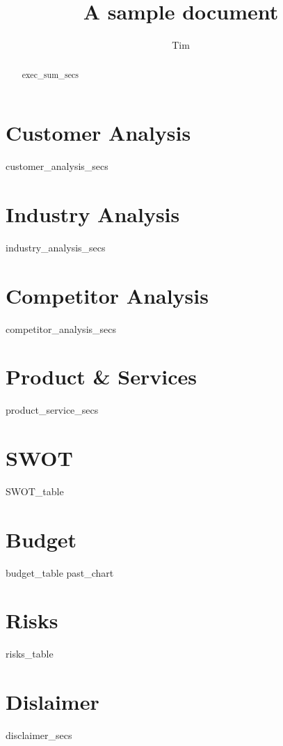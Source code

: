 \documentclass[11pt]{article}
\title{A sample document}
\author{Tim}
\begin{document}
\maketitle
\date

\newpage
\renewcommand{\abstractname}{Executive Summary}

\begin{abstract}
{{ exec_sum_secs }}
\end{abstract}

\newpage
\tableofcontents

\newpage{}
\section{Customer Analysis}
{{ customer_analysis_secs }}

\newpage{}
\section{Industry Analysis}
{{ industry_analysis_secs }}

\newpage{}
\section{Competitor Analysis}
{{ competitor_analysis_secs }}

\newpage{}
\section{Product \& Services}
{{ product_service_secs }}

\newpage{}
\section{SWOT}
{{ SWOT_table }}

\section{Budget}
{{ budget_table }}
{{ past_chart }}

\newpage{}
\section{Risks}
{{ risks_table }}

\newpage{}
\section{Dislaimer}
{{ disclaimer_secs }}
\end{document}
